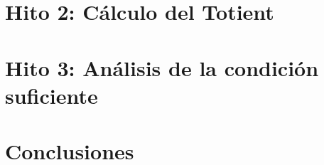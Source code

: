 \documentclass{uc3mpracticas}
\begin{document}
  \section{Hito 2: Cálculo del Totient}

  \section{Hito 3: Análisis de la condición suficiente}

  \section{Conclusiones}


  \newpage

  
  
\end{document}
